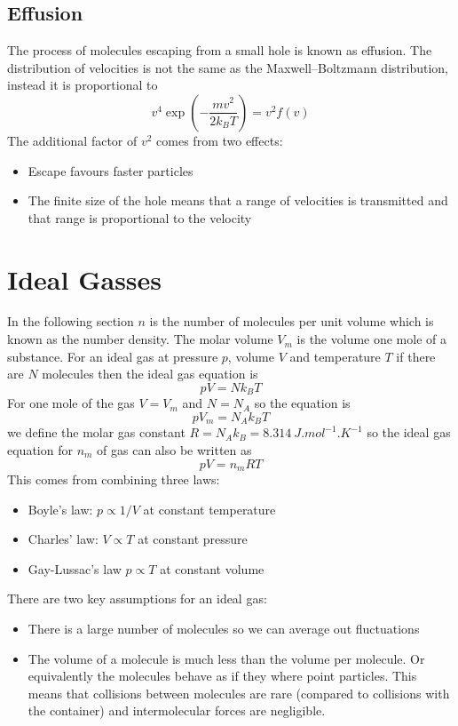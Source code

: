 \documentclass{article}
\begin{document}
    \subsection{Effusion}
    The process of molecules escaping from a small hole is known as effusion.
    The distribution of velocities is not the same as the Maxwell--Boltzmann distribution, instead it is proportional to
    \[v^4 \exp\left(-\frac{mv^2}{2k_BT}\right) = v^2 f(v)\]
    The additional factor of \(v^2\) comes from two effects:
    \begin{itemize}
        \item Escape favours faster particles
        \item The finite size of the hole means that a range of velocities is transmitted and that range is proportional to the velocity
    \end{itemize}

    \section{Ideal Gasses}
    In the following section \(n\) is the number of molecules per unit volume which is known as the number density.
    The molar volume \(V_m\) is the volume one mole of a substance.
    For an ideal gas at pressure \(p\), volume \(V\) and temperature \(T\) if there are \(N\) molecules then the ideal gas equation is
    \[pV = Nk_BT\]
    For one mole of the gas \(V = V_m\) and \(N = N_A\) so the equation is
    \[pV_m = N_Ak_BT\]
    we define the molar gas constant \(R = N_Ak_B = \SI{8.314}{J.mol^{-1}.K^{-1}}\) so the ideal gas equation for \(n_m\) of gas can also be written as
    \[pV = n_mRT\]
    This comes from combining three laws:
    \begin{itemize}
        \item Boyle's law: \(p \propto 1/V\) at constant temperature
        \item Charles' law: \(V \propto T\) at constant pressure
        \item Gay-Lussac's law \(p\propto T\) at constant volume
    \end{itemize}
    There are two key assumptions for an ideal gas:
    \begin{itemize}
        \item There is a large number of molecules so we can average out fluctuations
        \item The volume of a molecule is much less than the volume per molecule.
        Or equivalently the molecules behave as if they where point particles.
        This means that collisions between molecules are rare (compared to collisions with the container) and intermolecular forces are negligible.
    \end{itemize}
    
\end{document}
